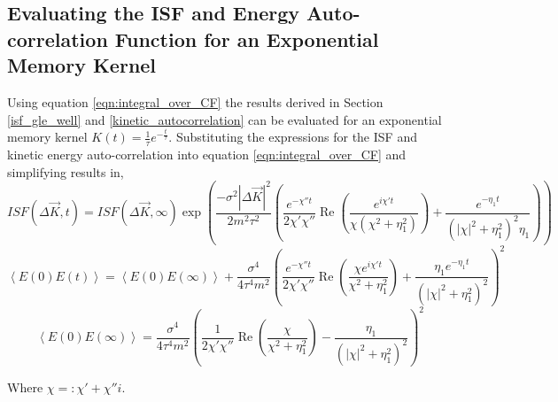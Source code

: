 \subsection{Evaluating the ISF and Energy Auto-correlation Function for an Exponential Memory Kernel}

Using equation \ref{eqn:integral_over_CF} the results derived in Section \ref{isf_gle_well} and \ref{kinetic_autocorrelation} can be evaluated for an exponential memory kernel $K(t)=\frac{1}{\tau}e^{-\frac{t}{\tau}}$. Substituting the expressions for the ISF and kinetic energy auto-correlation into equation \ref{eqn:integral_over_CF} and simplifying results in,
\begin{equation}
	ISF\left(\Delta \vec{K}, t\right) = ISF\left(\Delta \vec{K}, \infty\right) \exp\left(\frac{-\sigma^2\left|\Delta \vec{K}\right|^2}{2m^2\tau^2}\left(\frac{e^{-\chi''t}}{2\chi'\chi''}\operatorname{Re}\left(\frac{e^{i\chi't}}{\chi\left(\chi^2+\eta_1^2\right)}\right) + \frac{e^{-\eta_1t}}{\left(\left|\chi\right|^2+\eta_1^2\right)^2\eta_1}\right)\right) \label{isf_exp}
\end{equation}
\begin{equation}
	\left<E(0)E(t)\right>=\left<E(0)E(\infty)\right> + \frac{\sigma^4}{4\tau^4m^2}\left(\frac{e^{-\chi''t}}{2\chi'\chi''}\operatorname{Re}\left(\frac{\chi e^{i\chi't}}{\chi^2+\eta_1^2}\right) + \frac{\eta_1e^{-\eta_1 t}}{\left(\left|\chi\right|^2 + \eta_1^2\right)^2} \right)^2
\end{equation}
$$
\left<E(0)E(\infty)\right> = \frac{\sigma^4}{4\tau^4m^2}\left(\frac{1}{2\chi'\chi''}\operatorname{Re}\left(\frac{\chi}{\chi^2+\eta_1^2}\right) - \frac{\eta_1}{\left(\left|\chi\right|^2 + \eta_1^2\right)^2} \right)^2
$$

Where $\chi=:\chi'+\chi''i$.
